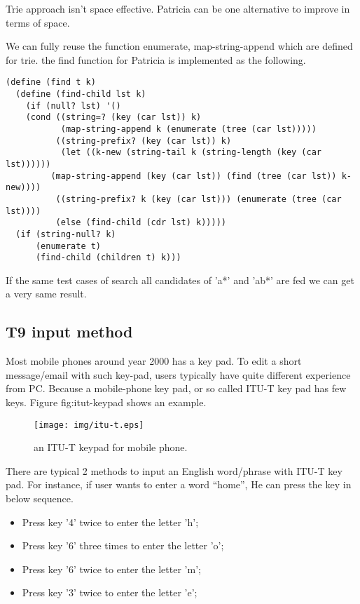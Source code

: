 \documentclass{article}
\begin{document}
Trie approach isn't space effective. Patricia can be one alternative
to improve in terms of space.

We can fully reuse the function enumerate, map-string-append which are
defined for trie. the find function for Patricia is implemented as the
following.

\begin{lstlisting}
(define (find t k)
  (define (find-child lst k)
    (if (null? lst) '()
	(cond ((string=? (key (car lst)) k) 
	       (map-string-append k (enumerate (tree (car lst)))))
	      ((string-prefix? (key (car lst)) k) 
	       (let ((k-new (string-tail k (string-length (key (car lst))))))
		 (map-string-append (key (car lst)) (find (tree (car lst)) k-new))))
	      ((string-prefix? k (key (car lst))) (enumerate (tree (car lst))))
	      (else (find-child (cdr lst) k)))))
  (if (string-null? k)
      (enumerate t)
      (find-child (children t) k)))
\end{lstlisting}

If the same test cases of search all candidates of 'a*' and 'ab*' are
fed we can get a very same result.


\subsection{T9 input method}
Most mobile phones around year 2000 has a key pad. To edit a short message/email
with such key-pad, users typically have quite different experience from PC.
Because a mobile-phone key pad, or so called ITU-T key pad has few keys.
Figure {fig:itut-keypad} shows an example.

\begin{figure}[htbp]
       \begin{center}
	\texttt{[image: img/itu-t.eps]}
        \caption{an ITU-T keypad for mobile phone.}
        \label{fig:itut-keypad}
       \end{center}
\end{figure}

There are typical 2 methods to input an English word/phrase with ITU-T key pad.
For instance, if user wants to enter a word ``home'', He can press the key
in below sequence.

\begin{itemize}
\item Press key '4' twice to enter the letter 'h';
\item Press key '6' three times to enter the letter 'o';
\item Press key '6' twice to enter the letter 'm';
\item Press key '3' twice to enter the letter 'e';
\end{itemize}
\end{document}
